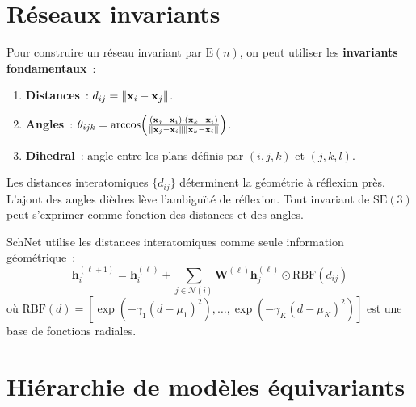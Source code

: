 \section{R\'eseaux invariants}

\begin{definition}
Pour construire un r\'eseau invariant par $\mathrm{E}(n)$, on peut utiliser
les \textbf{invariants fondamentaux}~:
\begin{enumerate}
    \item \textbf{Distances}~: $d_{ij} = \left\| \mathbf{x}_i - \mathbf{x}_j \right\|$.
    \item \textbf{Angles}~: $\theta_{ijk} = \arccos\!\left(\frac{(\mathbf{x}_j - \mathbf{x}_i) \cdot
          (\mathbf{x}_k - \mathbf{x}_i)}{\left\| \mathbf{x}_j - \mathbf{x}_i \right\|\left\| \mathbf{x}_k - \mathbf{x}_i \right\|}\right)$.
    \item \textbf{Dihedral}~: angle entre les plans d\'efinis par $(i,j,k)$ et $(j,k,l)$.
\end{enumerate}
\end{definition}

\begin{theoreme}
Les distances interatomiques $\{d_{ij}\}$ d\'eterminent la g\'eom\'etrie \`a
r\'eflexion pr\`es. L'ajout des angles di\`edres l\`eve l'ambigu\"it\'e de
r\'eflexion. Tout invariant de $\mathrm{SE}(3)$ peut s'exprimer comme
fonction des distances et des angles.
\end{theoreme}

\begin{definition}
SchNet utilise les distances interatomiques comme seule information
g\'eom\'etrique~:
\[
    \mathbf{h}_i^{(\ell+1)} = \mathbf{h}_i^{(\ell)} + \sum_{j \in \mathcal{N}(i)}
    \mathbf{W}^{(\ell)} \mathbf{h}_j^{(\ell)} \odot \text{RBF}(d_{ij})
\]
o\`u $\text{RBF}(d) = [\exp(-\gamma_1(d - \mu_1)^2), \ldots, \exp(-\gamma_K(d - \mu_K)^2)]$
est une base de fonctions radiales.
\end{definition}

\section{Hi\'erarchie de mod\`eles \'equivariants}

